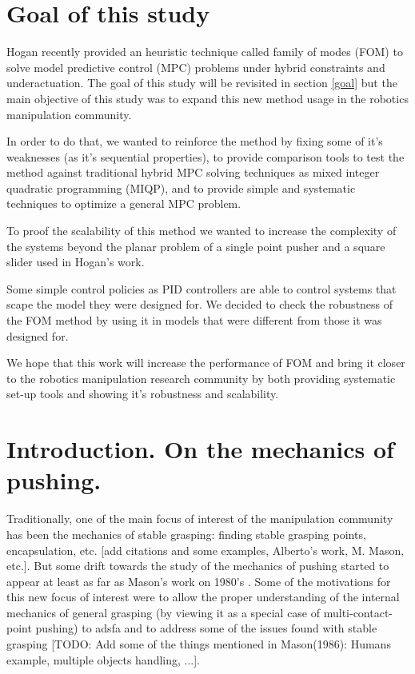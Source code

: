 \documentclass[12,twoside]{TFG-GM}
\theoremstyle{definition}
\theoremstyle{remark}
\begin{document}
\maketitle

\section{Goal of this study}
\label{briefgoal}
Hogan \cite{fom} recently provided an heuristic technique called family of modes (FOM) to solve model predictive control (MPC) problems under hybrid constraints and underactuation. The goal of this study will be revisited in section \ref{goal} but the main objective of this study was to expand this new method usage in the robotics manipulation community.

In order to do that, we wanted to reinforce the method by fixing some of it's weaknesses (as it's sequential properties), to provide comparison tools to test the method against traditional hybrid MPC solving techniques as mixed integer quadratic programming (MIQP), and to provide simple and systematic techniques to optimize a general MPC problem.

To proof the scalability of this method we wanted to increase the complexity of the systems beyond the planar problem of a single point pusher and a square slider used in Hogan's work.

Some simple control policies as PID controllers are able to control systems that scape the model they were designed for. We decided to check the robustness of the FOM method by using it in models that were different from those it was designed for.

We hope that this work will increase the performance of FOM and bring it closer to the robotics manipulation research community by both providing systematic set-up tools and showing it's robustness and scalability.

\section{Introduction. On the mechanics of pushing.}
\label{sec:intro}

Traditionally, one of the main focus of interest of the manipulation community has been the mechanics of stable grasping: finding stable grasping points, encapsulation, etc. [add citations and some examples, Alberto's work, M. Mason, etc.]. But some drift towards the study of the mechanics of pushing started to appear at least as far as Mason's work on 1980's \cite{pushing4}. Some of the motivations for this new focus of interest were to allow the proper understanding of the internal mechanics of general grasping (by viewing it as a special case of multi-contact-point pushing) to {adsfa} and to address some of the issues found with stable grasping [TODO: Add some of the things mentioned in Mason(1986): Humans example, multiple objects handling, ...].
\end{document}
